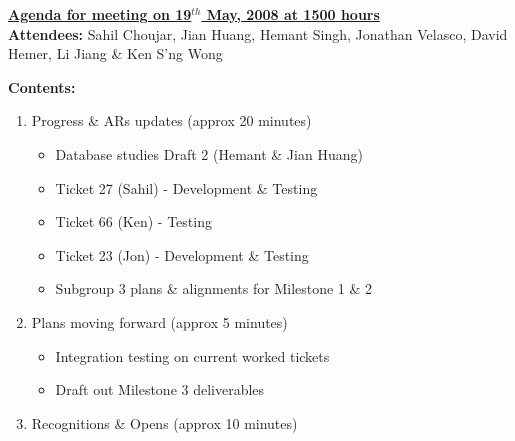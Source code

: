 \documentclass{letter}
\begin{document}
{\large \textbf{\underline{Agenda for meeting on 19$^{th}$ May, 2008 at 1500 hours}}}\\

\textbf{Attendees:} Sahil Choujar, Jian Huang, Hemant Singh, Jonathan Velasco, David Hemer, Li Jiang \& Ken S'ng Wong

\textbf{Contents:}

\begin{enumerate}
	\item Progress \& ARs updates (approx 20 minutes)
		\begin{itemize}
			\item Database studies Draft 2 (Hemant \& Jian Huang)
			\item Ticket 27 (Sahil) - Development \& Testing
			\item Ticket 66 (Ken) - Testing
			\item Ticket 23 (Jon) - Development \& Testing
			  \item Subgroup 3 plans \& alignments for Milestone 1 \& 2
		\end{itemize}
	\item Plans moving forward (approx 5 minutes)
		\begin{itemize}
			\item Integration testing on current worked tickets
			  \item Draft out Milestone 3 deliverables
		\end{itemize}
	\item Recognitions \& Opens (approx 10 minutes)
\end{enumerate}
 
\end{document}
